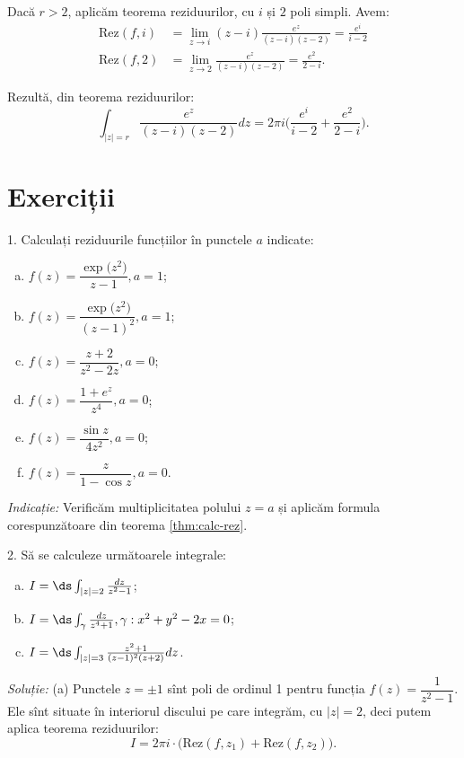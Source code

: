 Dacă $ r > 2 $, aplicăm teorema reziduurilor, cu $ i $ și $ 2 $ poli simpli. Avem:
\begin{align*}
  \mathrm{Rez}(f, i) &= \lim_{z \to i} (z - i) \frac{e^z}{(z - i)(z - 2)} = \frac{e^i}{i - 2} \\
  \mathrm{Rez}(f, 2) &= \lim_{z \to 2} \frac{e^z}{(z - i)(z - 2)} = \frac{e^2}{2 - i}.
\end{align*}

Rezultă, din teorema reziduurilor:
\[
  \int_{|z| = r} \frac{e^z}{(z - i)(z - 2)} dz = 2 \pi i \Big( \frac{e^i}{i - 2} + %
  \frac{e^2}{2 - i} \Big).
\]


\section{Exerciții}

1. Calculați reziduurile funcțiilor în punctele $ a $ indicate:
\begin{enumerate}[(a)]
\item $ f(z) = \dfrac{\exp\big(z^2\big)}{z - 1}, a = 1 $;
\item $ f(z) = \dfrac{\exp\big(z^2\big)}{(z - 1)^2}, a = 1 $;
\item $ f(z) = \dfrac{z + 2}{z^2 - 2z}, a = 0 $;
\item $ f(z) = \dfrac{1 + e^z}{z^4}, a = 0 $;
\item $ f(z) = \dfrac{\sin z}{4z^2}, a = 0 $;
\item $ f(z) = \dfrac{z}{1 - \cos z}, a = 0 $.
\end{enumerate}

\emph{Indicație:} Verificăm multiplicitatea polului $ z = a $ și aplicăm formula
corespunzătoare din teorema \ref{thm:calc-rez}.

\vspace{1cm}

2. Să se calculeze următoarele integrale:
\begin{enumerate}[(a)]
\item $ I = \ds\int_{|z| = 2} \frac{dz}{z^2 - 1} $;
\item $ I = \ds\int_\gamma \frac{dz}{z^4 + 1}, \gamma: x^2 + y^2 - 2x = 0 $;
\item $ I = \ds\int_{|z| = 3} \frac{z^2 + 1}{(z - 1)^2 (z + 2)} dz $.
\end{enumerate}

\emph{Soluție:} (a) Punctele $ z = \pm 1 $ sînt poli de ordinul 1 pentru
funcția $ f(z) = \dfrac{1}{z^2 - 1} $. Ele sînt situate în interiorul discului pe
care integrăm, cu $ |z| = 2 $, deci putem aplica teorema reziduurilor:
\[
  I = 2 \pi i \cdot \Big( \mathrm{Rez}(f, z_1) + \mathrm{Rez}(f, z_2) \Big).
\]

